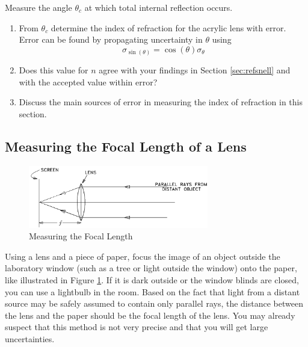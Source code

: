 Measure the angle $\theta_{c}$ at which total internal reflection occurs.
\begin{enumerate}
    \item   From $\theta_{c}$ determine the index of refraction for the acrylic lens with error.  Error can be found by propagating uncertainty in $\theta$ using
    \begin{equation}
      \sigma_{\sin(\theta)} = \cos(\theta) \sigma_\theta
    \end{equation}
    \item	Does this value for $n$ agree with your findings in Section \ref{sec:refsnell} and with the accepted value within error?
    \item Discuss the main sources of error in measuring the index of refraction in this section.
\end{enumerate}

\myskip

\subsection{Measuring the Focal Length of a Lens}
\label{sec:lengthI}
\begin{figure}[h]
\centering
\includegraphics[width=0.7\textwidth]{./Exp6/pic/image8.png}
\caption{Measuring the Focal Length}
\label{fig:focusedray}
\end{figure}
Using a lens and a piece of paper, focus the image of an object outside the laboratory window (such as a tree or light outside the window) onto the paper, like illustrated in Figure \ref{fig:focusedray}.  If it is dark outside or the window blinds are closed, you can use a lightbulb in the room. Based on the fact that light from a distant source may be safely assumed to contain only parallel rays, the distance between the lens and the paper should be the focal length of the lens. You may already suspect that this method is not very precise and that you will get large uncertainties.

